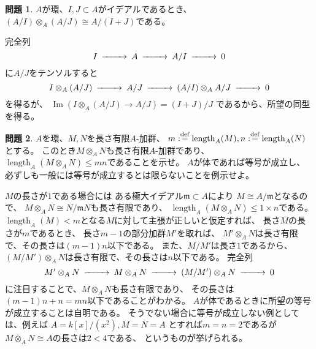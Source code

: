 \documentclass[uplatex]{jsarticle}
\makeatletter
\theoremstyle{definition}
\newtheorem{prob}[prob]{問題}
\renewenvironment{proof}[1][\proofname]{
  \pushQED{\qed}%
  \normalfont \topsep6\p@\@plus6\p@\relax
  \trivlist
  \item[\hskip\labelsep
    #1\@addpunct{\textbf{.}}]\ignorespaces
}{%
  \popQED\endtrivlist\@endpefalse
}
\providecommand{\proofname}{証明}
\DeclareMathOperator{\im}{\mathrm{Im}}
\DeclareMathOperator{\length}{\mathrm{length}}
\def\dfn{:\overset{\mbox{{\scriptsize def}}}{=}}
\makeatother
\begin{document}
\begin{prob}\label{prob: 1.3.2}
  \(A\)が環、\(I,J\subset A\)がイデアルであるとき、
  \((A/I)\otimes_A(A/J)\cong A/(I+J)\)である。
\end{prob}

\begin{proof}
  完全列
  \[
  \begin{CD}
    I @>>> A @>>> A/I @>>> 0
  \end{CD}
  \]
  に\(A/J\)をテンソルすると
  \[
  \begin{CD}
    I\otimes_A (A/J) @>>> A/J @>>> (A/I) \otimes_A A/J @>>> 0
  \end{CD}
  \]
  を得るが、
  \(\im(I\otimes_A (A/J) \to A/J) = (I+J)/J\)
  であるから、所望の同型を得る。
\end{proof}


\begin{prob}\label{prob: 1.3.3}
  \(A\)を環、\(M,N\)を長さ有限\(A\)-加群、
  \(m\dfn \length_A(M), n\dfn \length_A(N)\)とする。
  このとき\(M\otimes_A N\)も長さ有限\(A\)-加群であり、
  \(\length_A(M\otimes_A N)\leq mn\)であることを示せ。
  \(A\)が体であれば等号が成立し、
  必ずしも一般には等号が成立するとは限らないことを例示せよ。
\end{prob}

\begin{proof}
  \(M\)の長さが\(1\)である場合には
  ある極大イデアル\(\mathfrak{m}\subset A\)により
  \(M\cong A/\mathfrak{m}\)となるので、
  \(M\otimes_A N \cong N/\mathfrak{m}N\)も長さ有限であり、
  \(\length_A(M\otimes_A N) \leq 1\times n\)である。
  \(\length_A(M) < m\)となる\(M\)に対して主張が正しいと仮定すれば、
  長さ\(M\)の長さが\(m\)であるとき、
  長さ\(m-1\)の部分加群\(M'\)を取れば、
  \(M'\otimes_A N\)は長さ有限で、その長さは\((m-1)n\)以下である。
  また、\(M/M'\)は長さ\(1\)であるから、
  \((M/M')\otimes_A N\)は長さ有限で、その長さは\(n\)以下である。
  完全列
  \[
  \begin{CD}
    M' \otimes_A N @>>> M\otimes_A N @>>> (M/M') \otimes_A N @>>> 0
  \end{CD}
  \]
  に注目することで、\(M\otimes_A N\)も長さ有限であり、
  その長さは\((m-1)n + n = mn\)以下であることがわかる。
  \(A\)が体であるときに所望の等号が成立することは自明である。
  そうでない場合に等号が成立しない例としては、例えば
  \(A=k[x]/(x^2), M=N=A\)
  とすれば\(m=n=2\)であるが\(M\otimes_A N \cong A\)の長さは\(2 < 4\)である、
  というものが挙げられる。
\end{proof}
\end{document}
